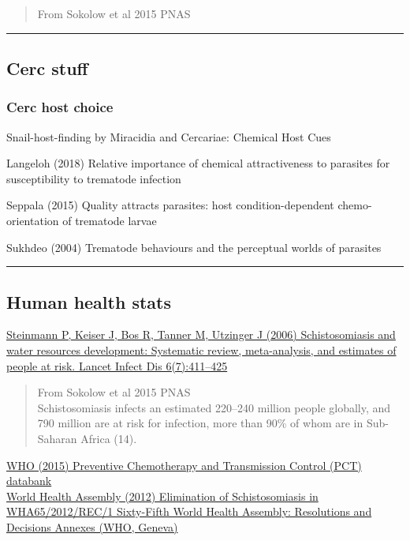 \documentclass[10,portrait]{article}
\begin{document}
\begin{quote}
From Sokolow et al 2015 PNAS
\end{quote}

\newpage  

\begin{center}\rule{0.5\linewidth}{\linethickness}\end{center}

\subsection{Cerc stuff}\label{cerc-stuff}

\subsubsection{Cerc host choice}\label{cerc-host-choice}

Snail-host-finding by Miracidia and Cercariae: Chemical Host Cues

Langeloh (2018) Relative importance of chemical attractiveness to
parasites for susceptibility to trematode infection

Seppala (2015) Quality attracts parasites: host condition-dependent
chemo-orientation of trematode larvae

Sukhdeo (2004) Trematode behaviours and the perceptual worlds of
parasites

\newpage  

\begin{center}\rule{0.5\linewidth}{\linethickness}\end{center}

\subsection{Human health stats}\label{human-health-stats}

\href{}{Steinmann P, Keiser J, Bos R, Tanner M, Utzinger J (2006)
Schistosomiasis and water resources development: Systematic review,
meta-analysis, and estimates of people at risk. Lancet Infect Dis
6(7):411--425}

\begin{quote}
From Sokolow et al 2015 PNAS\\
Schistosomiasis infects an estimated 220--240 million people globally,
and 790 million are at risk for infection, more than 90\% of whom are in
Sub-Saharan Africa (14).
\end{quote}

\href{www.who.int/neglected_diseases/preventive_chemotherapy/databank/en/}{WHO
(2015) Preventive Chemotherapy and Transmission Control (PCT)
databank}\\
\href{}{World Health Assembly (2012) Elimination of Schistosomiasis in
WHA65/2012/REC/1 Sixty-Fifth World Health Assembly: Resolutions and
Decisions Annexes (WHO, Geneva)}
\end{document}
